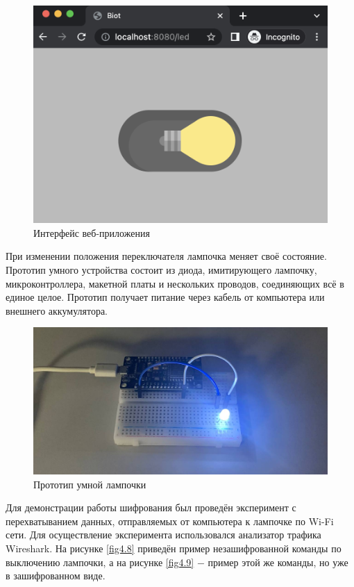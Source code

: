 	\begin{figure}[h]
		\centering
		\includegraphics[scale=0.7]{resources/client-light-on}
		\caption{Интерфейс веб-приложения}
		\label{fig4.6}
	\end{figure}

	При изменении положения переключателя лампочка меняет своё состояние. Прототип умного устройства
	состоит из диода, имитирующего лампочку, микроконтроллера, макетной платы и нескольких проводов,
	соединяющих всё в единое целое. Прототип получает питание через кабель от компьютера или внешнего
	аккумулятора.
	
	\begin{figure}[h]
		\centering
		\includegraphics[scale=0.3]{resources/device-prototype}
		\caption{Прототип умной лампочки}
		\label{fig4.7}
	\end{figure}

	Для демонстрации работы шифрования был проведён эксперимент с перехватыванием данных, отправляемых
	от компьютера к лампочке по Wi-Fi сети. Для осуществление эксперимента использовался анализатор трафика
	Wireshark. На рисунке \ref{fig4.8} приведён пример незашифрованной команды по выключению лампочки,
	а на рисунке \ref{fig4.9} $-$ пример этой же команды, но уже в зашифрованном виде.
	
